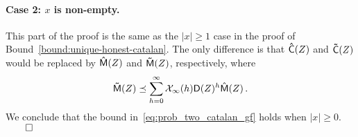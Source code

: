   \paragraph{Case 2: $x$ is non-empty.}
  This part of the proof is the same as the $|x| \geq 1$ case 
  in the proof of Bound~\ref{bound:unique-honest-catalan}. 
  The only difference is that 
  $\mathsf{\hat{C}}(Z)$ and $\mathsf{\tilde{C}}(Z)$ would be replaced by 
  $\mathsf{\hat{M}}(Z)$ and $\mathsf{\tilde{M}}(Z)$, respectively, where 
  \[
    \mathsf{\tilde{M}}(Z)\preceq \sum_{h = 0}^\infty \mathcal{X}_\infty(h) \mathsf{D}(Z)^h \mathsf{\hat{M}}(Z)
    \,.
  \]
  We conclude that the bound
  in~\eqref{eq:prob_two_catalan_gf} holds when $|x| \geq 0$. 
  \hfill$\qed$
